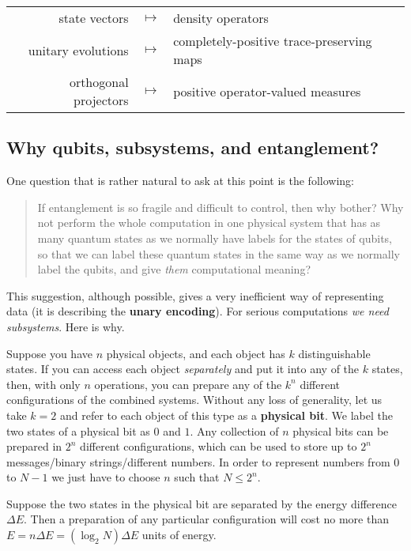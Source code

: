 \documentclass[fleqn]{article}
\renewcommand{\toprule}{}
\renewcommand{\bottomrule}{}
\begin{document}
\begin{longtable}[]{@{}rcl@{}}
\toprule
\endhead
state vectors & \(\longmapsto\) & density operators\tabularnewline
unitary evolutions & \(\longmapsto\) & completely-positive trace-preserving maps\tabularnewline
orthogonal projectors & \(\longmapsto\) & positive operator-valued measures\tabularnewline
\bottomrule
\end{longtable}

\hypertarget{why-qubits-subsystems-and-entanglement}{%
\subsection{Why qubits, subsystems, and entanglement?}\label{why-qubits-subsystems-and-entanglement}}

One question that is rather natural to ask at this point is the following:

\begin{quote}
If entanglement is so fragile and difficult to control, then why bother?
Why not perform the whole computation in one physical system that has as many quantum states as we normally have labels for the states of qubits, so that we can label these quantum states in the same way as we normally label the qubits, and give \emph{them} computational meaning?
\end{quote}

This suggestion, although possible, gives a very inefficient way of representing data (it is describing the \textbf{unary encoding}).
For serious computations \emph{we need subsystems}.
Here is why.

Suppose you have \(n\) physical objects, and each object has \(k\) distinguishable states.
If you can access each object \emph{separately} and put it into any of the \(k\) states, then, with only \(n\) operations, you can prepare any of the \(k^{n}\) different configurations of the combined systems.
Without any loss of generality, let us take \(k=2\) and refer to each object of this type as a \textbf{physical bit}.
We label the two states of a physical bit as \(0\) and \(1\).
Any collection of \(n\) physical bits can be prepared in \(2^{n}\) different configurations, which can be used to store up to \(2^{n}\) messages/binary strings/different numbers.
In order to represent numbers from \(0\) to \(N-1\) we just have to choose \(n\) such that \(N\leqslant 2^n\).

Suppose the two states in the physical bit are separated by the energy difference \(\Delta E\).
Then a preparation of any particular configuration will cost no more than \(E=n \Delta E=(\log_2 N)\Delta E\) units of energy.
\end{document}
